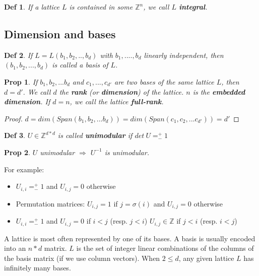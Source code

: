 \documentclass[11pt]{article}
\newtheorem{definition}{Def}
\newtheorem{proposition}{Prop}
\begin{document}
\begin{definition}
If a lattice $L$ is contained in some $\mathbb{Z}^n$, we call $L$ \textbf{integral}.
\end{definition}

\subsection{Dimension and bases}

\begin{definition}
If $L=L(b_1,b_2,..,b_d)$ with $b_1,....,b_d$ linearly independent, then $(b_1,b_2,...,b_d)$ is called a basis of $L$.
\end{definition}

\begin{proposition}
If $b_1,b_2,...b_d$ and $c_1,...,c_{d'}$ are two bases of the same lattice $L$, then $d=d'$. We call $d$ the \textbf{rank} (or \textbf{dimension}) of the lattice. $n$ is the \textbf{embedded dimension}. If $d=n$, we call the lattice \textbf{full-rank}.
\end{proposition}

\begin{proof}
$d=dim(Span(b_1,b_2,...b_d))=dim(Span(c_1,c_2,...c_{d'}))=d'$
\end{proof}

\begin{definition}
$U \in \mathbb{Z}^{d*d}$ is called \textbf{unimodular} if $det \ U = ^+_-1$
\end{definition}

\begin{proposition}
$U$ unimodular $\Rightarrow$ $U^{-1}$ is unimodular.
\end{proposition}

For example:
\begin{itemize}
\item $U_{i,i}=^+_- 1$ and $U_{i,j}=0$ otherwise
\item Permutation matrices: $U_{i,j}=1$ if $j=\sigma(i)$ and $U_{i,j}=0$ otherwise
\item $U_{i,i}=^+_- 1$ and $U_{i,j}=0$ if $i < j$ (resp. $j<i$)  $U_{i,j}\in \mathbb{Z}$ if $j < i$ (resp. $i<j$)
\end{itemize}

A lattice is most often represented by one of its bases.
A basis is usually encoded into an $n*d$ matrix.
$L$ is the set of integer linear combinations of the columns of the basis matrix (if we use column vectors).
When $2 \leq d$, any given lattice $L$ has infinitely many bases.
\end{document}
